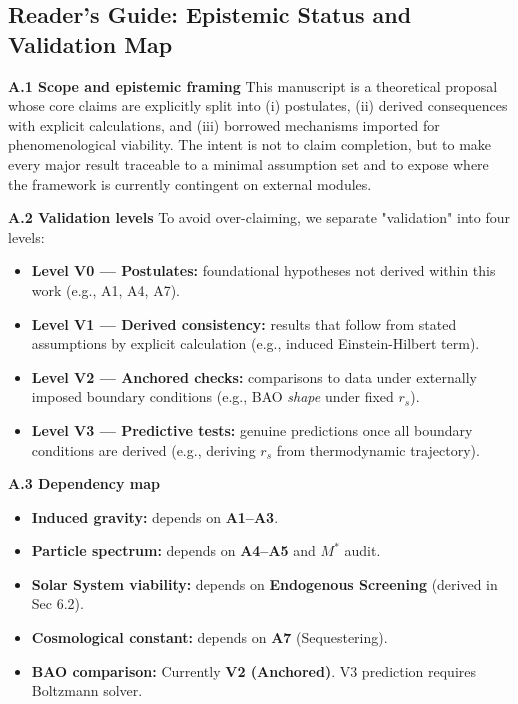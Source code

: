 \documentclass[a4paper,12pt]{article}
\begin{document}
\subsection{Reader's Guide: Epistemic Status and Validation Map}

\textbf{A.1 Scope and epistemic framing}
This manuscript is a theoretical proposal whose core claims are explicitly split into (i) postulates, (ii) derived consequences with explicit calculations, and (iii) borrowed mechanisms imported for phenomenological viability. The intent is not to claim completion, but to make every major result traceable to a minimal assumption set and to expose where the framework is currently contingent on external modules.

\textbf{A.2 Validation levels}
To avoid over-claiming, we separate "validation" into four levels:
\begin{itemize}
    \item \textbf{Level V0 — Postulates:} foundational hypotheses not derived within this work (e.g., A1, A4, A7).
    \item \textbf{Level V1 — Derived consistency:} results that follow from stated assumptions by explicit calculation (e.g., induced Einstein-Hilbert term).
    \item \textbf{Level V2 — Anchored checks:} comparisons to data under externally imposed boundary conditions (e.g., BAO \emph{shape} under fixed $r_s$).
    \item \textbf{Level V3 — Predictive tests:} genuine predictions once all boundary conditions are derived (e.g., deriving $r_s$ from thermodynamic trajectory).
\end{itemize}

\textbf{A.3 Dependency map}
\begin{itemize}
    \item \textbf{Induced gravity:} depends on \textbf{A1--A3}.
    \item \textbf{Particle spectrum:} depends on \textbf{A4--A5} and $M^*$ audit.
    \item \textbf{Solar System viability:} depends on \textbf{Endogenous Screening} (derived in Sec 6.2).
    \item \textbf{Cosmological constant:} depends on \textbf{A7} (Sequestering).
    \item \textbf{BAO comparison:} Currently \textbf{V2 (Anchored)}. V3 prediction requires Boltzmann solver.
\end{itemize}
\end{document}
